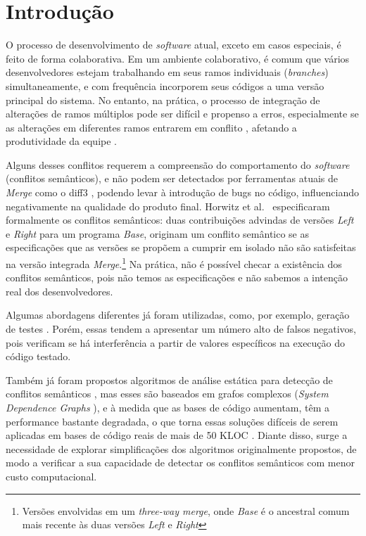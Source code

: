 \section{Introdução}
O processo de desenvolvimento de \emph{software} atual, exceto em casos especiais, é feito de forma colaborativa. Em um ambiente colaborativo, é comum que vários desenvolvedores estejam trabalhando em seus ramos individuais (\emph{branches}) simultaneamente, e com frequência incorporem seus códigos a uma versão principal do sistema. No entanto, na prática, o processo de integração de alterações de ramos múltiplos pode ser difícil e propenso a erros, especialmente se as alterações em diferentes ramos entrarem em conflito \cite{Bird2012AssessingTV}, afetando a produtividade da equipe \cite{6915251}.

Alguns desses conflitos requerem a compreensão do comportamento do \emph{software} (conflitos semânticos), e não podem ser detectados por ferramentas atuais de \emph{Merge} como o diff3 \cite{10.5555/1781794.1781836}, podendo levar à introdução de bugs no código, influenciando negativamente na qualidade do produto final.  Horwitz et al.~\cite{Horwitz1989IntegratingNV} especificaram formalmente os conflitos semânticos: duas contribuições advindas de versões \emph{Left} e \emph{Right} para um programa \emph{Base}, originam um conflito semântico se as especificações que as versões se propõem a cumprir em isolado não são satisfeitas na versão integrada \emph{Merge}.\footnote{Versões envolvidas em um \emph{three-way merge}, onde \emph{Base} é o ancestral comum mais recente às duas versões \emph{Left} e \emph{Right}} 
Na prática, não é possível checar a existência dos conflitos semânticos, pois não temos as especificações e não sabemos a intenção real dos desenvolvedores.

Algumas abordagens diferentes já foram utilizadas, como, por exemplo, geração de testes \cite{LeusonSilva2020}. Porém,
essas tendem a apresentar um número alto de falsos negativos, pois verificam se há interferência a partir de valores específicos na execução do código testado.

Também já foram propostos algoritmos de análise estática para detecção de conflitos semânticos  \cite{InformationFlowRoberto, Binkley95programintegration, Horwitz1989IntegratingNV}, mas esses são baseados em grafos complexos (\emph{System Dependence Graphs} \cite{Horwitz1989IntegratingNV}), e à medida que as bases de código aumentam, têm a performance bastante degradada, o que torna essas soluções difíceis de serem aplicadas em bases de código reais de mais de 50 KLOC \cite{InformationFlowRoberto}. Diante disso, surge a necessidade de explorar simplificações dos algoritmos originalmente propostos, de modo a verificar a sua capacidade de detectar os conflitos semânticos com menor custo computacional.

